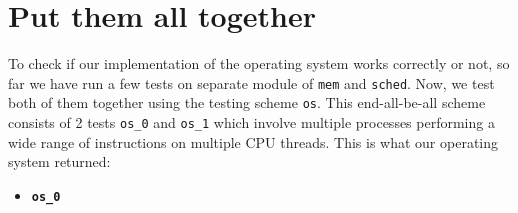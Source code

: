 \documentclass[a4paper]{article}
\numberwithin{equation}{section}
\begin{document}
\section{Put them all together}
To check if our implementation of the operating system works correctly or not, so far we have run a few tests on separate module of \texttt{mem} and \texttt{sched}.
Now, we test both of them together using the testing scheme  \texttt{os}.
This end-all-be-all scheme consists of 2 tests \texttt{os_0} and \texttt{os_1} which involve multiple processes performing a wide range of instructions on multiple CPU threads.
This is what our operating system returned:

\begin{itemize}
  \item \textbf{\texttt{os_0}}
\end{itemize}
\end{document}

